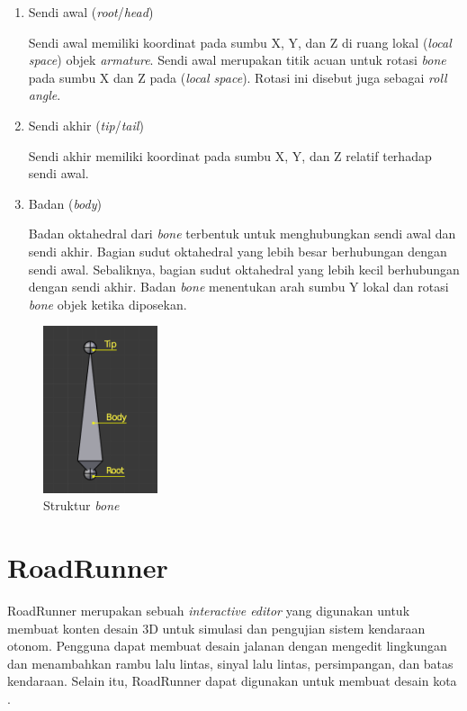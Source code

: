 \begin{enumerate}
    \item Sendi awal (\textit{root}/\textit{head})

    Sendi awal memiliki koordinat pada sumbu X, Y, dan Z di ruang lokal
    (\textit{local space}) objek \textit{armature}. Sendi awal merupakan titik
    acuan untuk rotasi \textit{bone} pada sumbu X dan Z pada (\textit{local
    space}). Rotasi ini disebut juga sebagai \textit{roll angle}.

    \item Sendi akhir (\textit{tip}/\textit{tail})

    Sendi akhir memiliki koordinat pada sumbu X, Y, dan Z relatif terhadap sendi
    awal.

    \item Badan (\textit{body})

    Badan oktahedral dari \textit{bone} terbentuk untuk menghubungkan sendi awal
    dan sendi akhir. Bagian sudut oktahedral yang lebih besar berhubungan
    dengan sendi awal. Sebaliknya, bagian sudut oktahedral yang lebih kecil
    berhubungan dengan sendi akhir. Badan \textit{bone} menentukan arah sumbu Y
    lokal dan rotasi \textit{bone} objek ketika diposekan.

\end{enumerate}

\begin{figure}[ht]
    \centering
    \includegraphics[width=0.3\textwidth]{resources/chapter-2-bone-structure.png}
    \caption{Struktur \textit{bone} \parencite{blender-bones-structure}}
    \label{fig:bone-structure}
\end{figure}

\section{RoadRunner}
RoadRunner merupakan sebuah \textit{interactive editor} yang digunakan untuk
membuat konten desain 3D untuk simulasi dan pengujian sistem kendaraan otonom.
Pengguna dapat membuat desain jalanan dengan mengedit lingkungan dan menambahkan
rambu lalu lintas, sinyal lalu lintas, persimpangan, dan batas kendaraan. Selain
itu, RoadRunner dapat digunakan untuk membuat desain kota \parencite{roadrunner}.

